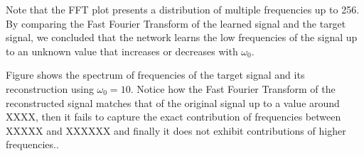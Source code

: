  Note that the FFT plot presents a distribution of multiple frequencies up to 256. By comparing the Fast Fourier Transform of the learned signal and the target signal, we concluded that the network learns the low frequencies of the signal up to an unknown value that increases or decreases with $\omega_0$.

Figure shows the spectrum of frequencies of the target signal and its reconstruction using $\omega_0 = 10$. Notice how the Fast Fourier Transform of the reconstructed signal matches that of the original signal up to a value around XXXX, then it fails to capture the exact contribution of frequencies between XXXXX and XXXXXX and finally it does not exhibit contributions of higher frequencies..


